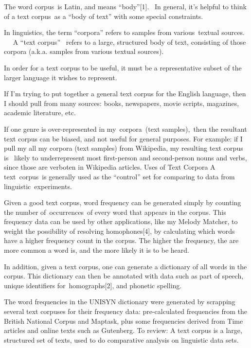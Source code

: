
\def\mytitle{ThesisDocumentsMelodyMatcher}
\def\myauthor{Jenee Hughes}
\def\latexmode{memoir}

The word corpus is Latin, and means ``body''[1].  In general, it's helpful to think of a text corpus as a ``body of text'' with some special constraints.

In linguistics, the term ``corpora'' refers to samples from various textual sources.
  
A ``text corpus''  refers to a large, structured body of text, consisting of those corpora (a.k.a. samples from various textual sources). 

In order for a text corpus to be useful, it must be a representative subset of the larger language it wishes to represent. 

If I'm trying to put together a general text corpus for the English language, then I should pull from many sources: books, newspapers, movie scripts, magazines, academic literature, etc. 

If one genre is over-represented in my corpora (text samples), then the resultant text corpus can be biased, and not useful for general purposes. For example: if I pull my all my corpora (text samples) from Wikipedia, my resulting text corpus is  likely to underrepresent most first-person and second-person nouns and verbs, since those are verboten in Wikipedia articles.
Uses of Text Corpora
A text corpus is generally used as the ``control'' set for comparing to data from linguistic experiments. 

Given a good text corpus, word frequency can be generated simply by counting the number of occurrences of every word that appears in the corpus. This frequency data can be used by other applications, like my Melody Matcher, to weight the possibility of resolving homophones[4], by calculating which words have a higher frequency count in the corpus. The higher the frequency, the are more common a word is, and the more likely it is to be heard.

In addition, given a text corpus, one can generate a dictionary of all words in the corpus. This dictionary can then be annotated with data such as part of speech, unique identifiers for homographs[2], and phonetic spelling. 

The word frequencies in the UNISYN dictionary were generated by scrapping several text corpuses for their frequency data: pre-calculated frequencies from the British National Corpus and Maptask, plus some frequencies derived from Time articles and online texts such as Gutenberg.
To review:
A text corpus is a large, structured set of texts, used to do comparative analysis on linguistic data sets.

